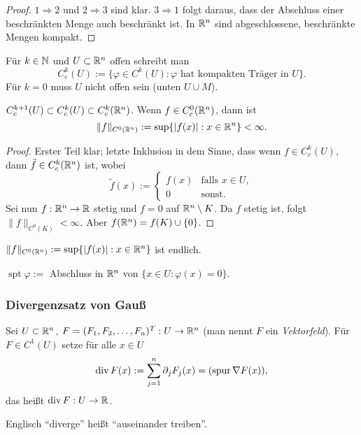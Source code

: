 \begin{proof}
 $1 \Rightarrow 2$ und $2 \Rightarrow 3$ sind klar. $3 \Rightarrow 1$ folgt daraus, dass der Abschluss einer beschränkten Menge auch beschränkt ist. In $\mathbb{R}^n$ sind abgeschlossene, beschränkte Mengen kompakt.
\end{proof}

Für $k \in \mathbb{N}$ und $U \subset \mathbb{R}^n$ offen schreibt man
\[ C_c^k(U) := \{ \varphi \in C^k(U) : \varphi \text{ hat kompakten Träger in } U \}. \]
Für $k=0$ muss $U$ nicht offen sein (unten $U \cup M$).

\begin{rmrk}
 $C_c^{k+1}(U) \subset C_c^k(U) \subset C_c^k(\mathbb{R}^n)$. Wenn $f \in C_c^0(\mathbb{R}^n)$, dann ist
 \[ \| f \|_{C^0(\mathbb{R}^n)} := \sup \{ |f(x)| : x \in \mathbb{R}^n \} < \infty. \]
\end{rmrk}

\begin{proof}
 Erster Teil klar; letzte Inklusion in dem Sinne, dass wenn $f \in C_c^k(U)$, dann $\tilde{f} \in C^k_c(\mathbb{R}^n)$ ist, wobei
 \[ \tilde{f}(x) := \begin{cases} f(x) &\text{falls } x \in U, \\ 0 &\text{sonst.} \end{cases} \]
 Sei nun $f: \mathbb{R}^n \to \mathbb{R}$ stetig und $f = 0$ auf $\mathbb{R}^n \setminus K$. Da $f$ stetig ist, folgt $\| f \|_{C^0(K)} < \infty$. Aber $f(\mathbb{R}^n) = f(K) \cup \{ 0 \}$.
\end{proof}

$\| f \|_{C^0(\mathbb{R}^n)} := \sup \{ | f (x) | : x \in \mathbb{R}^n \}$ ist endlich.

$\operatorname{spt} \varphi :=$ Abschluss in $\mathbb{R}^n$ von $\{ x \in U : \varphi(x) = 0 \}$.

\subsubsection{Divergenzsatz von Gauß}
\begin{defn}
 Sei $U \subset \mathbb{R}^n$, $F = (F_1, F_2, \ldots, F_n)^T : U \to \mathbb{R}^n$ (man nennt $F$ ein \emph{Vektorfeld}). Für $F \in C^1(U)$ setze für alle $x \in U$
 \[ \operatorname{div} F(x) := \sum_{j=1}^n \partial_j F_j(x) = (\mathrm{spur}\, \nabla F(x)), \]
 das heißt $\operatorname{div} F: U \to \mathbb{R}$.
\end{defn}

\begin{rmrk}
 Englisch ``diverge'' heißt ``auseinander treiben''.
\end{rmrk}

